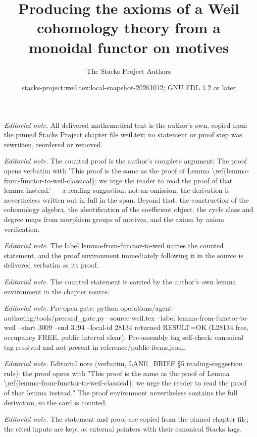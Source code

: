 \documentclass[10pt,a4paper]{amsart}
\title{Producing the axioms of a Weil cohomology theory from a monoidal functor on motives}
\author{The Stacks Project Authors}
\date{stacks-project:weil.tex:local-snapshot-20261012; GNU FDL 1.2 or later}
\theoremstyle{plain}
\theoremstyle{definition}
\theoremstyle{remark}
\numberwithin{equation}{subsection}
\begin{document}
\maketitle
\noindent\textit{Editorial note.} All delivered mathematical text is the author's own, copied from the pinned Stacks Project chapter file weil.tex; no statement or proof step was rewritten, reordered or removed.\par\medskip
\noindent\textit{Editorial note.} The counted proof is the author's complete argument: The proof opens verbatim with 'This proof is the same as the proof of Lemma \textbackslash{}ref\{lemma-from-functor-to-weil-classical\}; we urge the reader to read the proof of that lemma instead.' — a reading suggestion, not an omission: the derivation is nevertheless written out in full in the span. Beyond that: the construction of the cohomology algebra, the identification of the coefficient object, the cycle class and degree maps from morphism groups of motives, and the axiom by axiom verification.\par\medskip
\noindent\textit{Editorial note.} The label lemma-from-functor-to-weil names the counted statement, and the proof environment immediately following it in the source is delivered verbatim as its proof.\par\medskip
\noindent\textit{Editorial note.} The counted statement is carried by the author's own lemma environment in the chapter source.\par\medskip
\noindent\textit{Editorial note.} Pre-open gate: python operations/agent-authoring/tools/precard\_gate.py --source weil.tex --label lemma-from-functor-to-weil --start 3009 --end 3194 --local-id 28134 returned RESULT=OK (L28134 free, occupancy FREE, public interval clear). Pre-assembly tag self-check: canonical tag resolved and not present in reference/public-items.jsonl.\par\medskip
\noindent\textit{Editorial note.} Editorial note (verbatim, LANE\_BRIEF §5 reading-suggestion rule): the proof opens with "This proof is the same as the proof of Lemma \textbackslash{}ref\{lemma-from-functor-to-weil-classical\}; we urge the reader to read the proof of that lemma instead." The proof environment nevertheless contains the full derivation, so the card is counted.\par\medskip
\noindent\textit{Editorial note.} The statement and proof are copied from the pinned chapter file; the cited inputs are kept as external pointers with their canonical Stacks tags.\par\medskip
\end{document}
